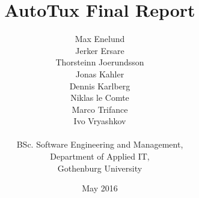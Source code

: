 \title{AutoTux Final Report}
\author{Max Enelund \\ Jerker Ersare \\
        Thorsteinn Joerundsson \\ Jonas Kahler \\
        Dennis Karlberg \\ Niklas le Comte \\
        Marco Trifance \\ Ivo Vryashkov \\ \\
        BSc. Software Engineering and Management, \\
        Department of Applied IT, \\ Gothenburg University}
\date{May 2016}
\maketitle
